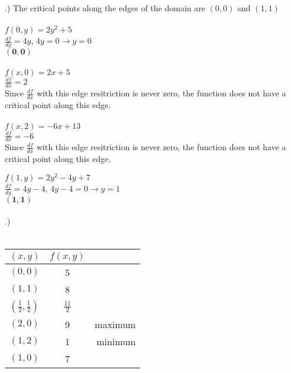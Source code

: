 \documentclass[12pt]{article}
\begin{document}
.) The critical points along the edges of the domain are $(0,0)$ and $(1,1)$\\\\
\noindent $f(0, y) = 2y^{2} + 5$\\
\noindent $\frac{df}{dy} = 4y$, \hspace{10pt} $4y = 0 \rightarrow y = 0$\\
\noindent $\mathbf{(0, 0)}$\\\\

\noindent $f(x, 0) = 2x + 5$\\
\noindent $\frac{df}{dx} = 2$\\
\noindent Since $\frac{df}{dx}$ with this edge resitriction is never zero,
the function does not have a critical point along this edge.\\\\

\noindent $f(x, 2) = -6x + 13$\\
\noindent $\frac{df}{dx} = -6$\\
\noindent Since $\frac{df}{dx}$ with this edge resitriction is never zero,
the function does not have a critical point along this edge.\clearpage

\noindent $f(1, y) = 2y^{2} -4y + 7$\\
\noindent $\frac{df}{dy} = 4y - 4$, \hspace{10pt} $4y - 4 = 0 \rightarrow y = 1$\\
\noindent $\mathbf{(1, 1)}$\\\\


.) \\\\


\begin{table}[h!]
  \begin{center}
    \label{tab:table1}
    \begin{tabular}{l|c|r} %
      $(x,y)$ & $f(x,y)$ &  \\
      \hline
      $(0, 0)$ & 5 & \\
      $(1,1)$ & 8  & \\
      $(\frac{1}{2}, \frac{1}{2})$ & $\frac{11}{2}$ & \\
      $(2,0)$ & 9  & maximum\\
      $(1,2)$ & 1  & minimum \\
      $(1,0)$ & 7  & \\
    \end{tabular}
  \end{center}
\end{table}
\end{document}

